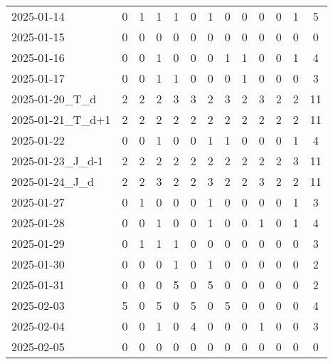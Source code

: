 \documentclass[dvipdfmx,oneside]{article}
\begin{document}
\begin{longtable}{lcccccccccccc}
        2025-01-14 &     0 &     1 &     1 &     1 &     0 &     1 &     0 &     0 &     0 &     0 &     1 &      5 \\
        2025-01-15 &     0 &     0 &     0 &     0 &     0 &     0 &     0 &     0 &     0 &     0 &     0 &      0 \\
        2025-01-16 &     0 &     0 &     1 &     0 &     0 &     0 &     1 &     1 &     0 &     0 &     1 &      4 \\
        2025-01-17 &     0 &     0 &     1 &     1 &     0 &     0 &     0 &     1 &     0 &     0 &     0 &      3 \\
  2025-01-20\_T\_d &     2 &     2 &     2 &     3 &     3 &     2 &     3 &     2 &     3 &     2 &     2 &     11 \\
2025-01-21\_T\_d+1 &     2 &     2 &     2 &     2 &     2 &     2 &     2 &     2 &     2 &     2 &     2 &     11 \\
        2025-01-22 &     0 &     0 &     1 &     0 &     0 &     1 &     1 &     0 &     0 &     0 &     1 &      4 \\
2025-01-23\_J\_d-1 &     2 &     2 &     2 &     2 &     2 &     2 &     2 &     2 &     2 &     2 &     3 &     11 \\
  2025-01-24\_J\_d &     2 &     2 &     3 &     2 &     2 &     3 &     2 &     2 &     3 &     2 &     2 &     11 \\
        2025-01-27 &     0 &     1 &     0 &     0 &     0 &     1 &     0 &     0 &     0 &     0 &     1 &      3 \\
        2025-01-28 &     0 &     0 &     1 &     0 &     0 &     1 &     0 &     0 &     1 &     0 &     1 &      4 \\
        2025-01-29 &     0 &     1 &     1 &     1 &     0 &     0 &     0 &     0 &     0 &     0 &     0 &      3 \\
        2025-01-30 &     0 &     0 &     0 &     1 &     0 &     1 &     0 &     0 &     0 &     0 &     0 &      2 \\
        2025-01-31 &     0 &     0 &     0 &     5 &     0 &     5 &     0 &     0 &     0 &     0 &     0 &      2 \\
        2025-02-03 &     5 &     0 &     5 &     0 &     5 &     0 &     5 &     0 &     0 &     0 &     0 &      4 \\
        2025-02-04 &     0 &     0 &     1 &     0 &     4 &     0 &     0 &     0 &     1 &     0 &     0 &      3 \\
        2025-02-05 &     0 &     0 &     0 &     0 &     0 &     0 &     0 &     0 &     0 &     0 &     0 &      0 \\

\end{longtable}
\end{document}
